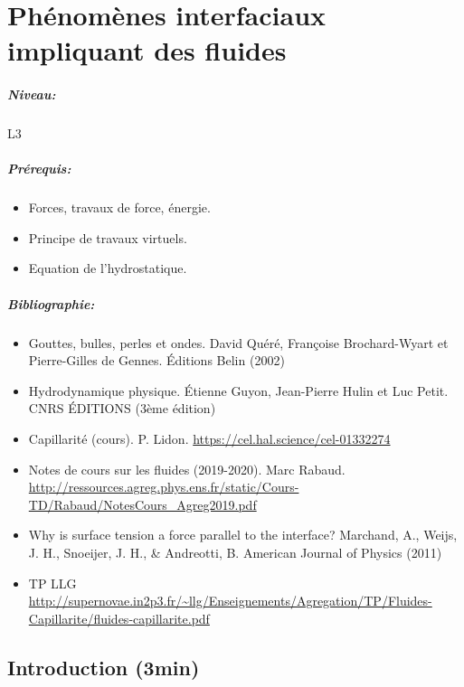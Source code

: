 \documentclass[11pt]{report}
\numberwithin{figure}{section}
\numberwithin{equation}{section}
\numberwithin{table}{section}
\newcommand{\1}{\boldsymbol{1}}
\begin{document}
\newpage




\chapter{Phénomènes interfaciaux impliquant des fluides}


\paragraph*{Niveau:} L3
\paragraph*{Prérequis:} 
\begin{itemize}
\item Forces, travaux de force, énergie.
\item Principe de travaux virtuels.
\item Equation de l'hydrostatique.
\end{itemize}

\paragraph*{Bibliographie:}
\begin{itemize}
\item  Gouttes, bulles, perles et ondes. David Quéré, Françoise Brochard-Wyart et Pierre-Gilles de Gennes. \'Editions Belin (2002)
\item Hydrodynamique physique. \'Etienne Guyon, Jean-Pierre Hulin et Luc Petit.  CNRS ÉDITIONS (3ème édition) 
\item Capillarité (cours). P. Lidon. \url{https://cel.hal.science/cel-01332274}
\item Notes de cours sur les fluides (2019-2020). Marc Rabaud. \url{http://ressources.agreg.phys.ens.fr/static/Cours-TD/Rabaud/NotesCours_Agreg2019.pdf}
\item Why is surface tension a force parallel to the interface? Marchand, A., Weijs, J. H., Snoeijer, J. H., \& Andreotti, B. American Journal of Physics (2011)
\item TP LLG \url{http://supernovae.in2p3.fr/~llg/Enseignements/Agregation/TP/Fluides-Capillarite/fluides-capillarite.pdf}
\end{itemize}

 \section*{Introduction (3min)}
\end{document}
